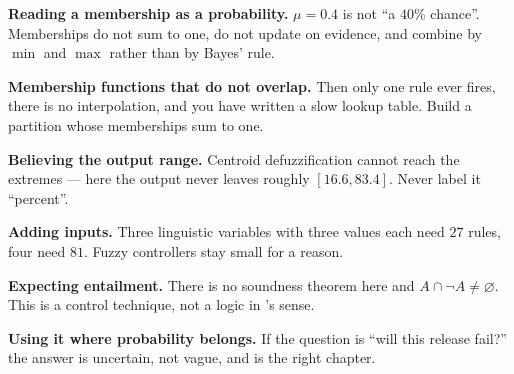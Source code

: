 \begin{pitfall}
\begin{tight}
  \item \textbf{Reading a membership as a probability.} $\mu = 0.4$ is not ``a
        $40\%$ chance''. Memberships do not sum to one, do not update on evidence,
        and combine by $\min$ and $\max$ rather than by Bayes' rule.
  \item \textbf{Membership functions that do not overlap.} Then only one rule ever
        fires, there is no interpolation, and you have written a slow lookup table.
        Build a partition whose memberships sum to one.
  \item \textbf{Believing the output range.} Centroid defuzzification cannot reach
        the extremes --- here the output never leaves roughly $[16.6, 83.4]$. Never label
        it ``percent''.
  \item \textbf{Adding inputs.} Three linguistic variables with three values each
        need $27$ rules, four need $81$. Fuzzy controllers stay small for a reason.
  \item \textbf{Expecting entailment.} There is no soundness theorem here and
        $A \cap \neg A \ne \varnothing$. This is a control technique, not a logic in
        's sense.
  \item \textbf{Using it where probability belongs.} If the question is ``will this
        release fail?'' the answer is uncertain, not vague, and 
        is the right chapter.
\end{tight}
\end{pitfall}

